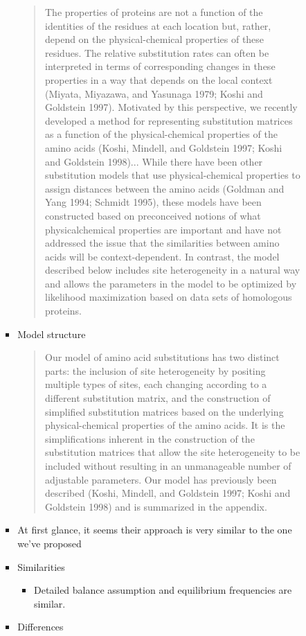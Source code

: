 \begin{itemize}
\begin{itemize}
\begin{itemize}
\begin{itemize}
\begin{quote}
        The properties of proteins are not a function of the identities of the residues at each location but, rather, depend on the physical-chemical properties of these residues. The relative substitution rates can often be interpreted in terms of corresponding changes in these properties in a way that depends on the local context (Miyata, Miyazawa, and Yasunaga 1979; Koshi and Goldstein 1997). Motivated by this perspective, we recently developed a method for representing substitution matrices as a function of the physical-chemical properties of the amino acids (Koshi, Mindell, and Goldstein 1997; Koshi and Goldstein 1998)...  While there have been other substitution models that use physical-chemical properties to assign distances between the amino acids (Goldman and Yang 1994; Schmidt 1995), these models have been constructed based on preconceived notions of what physicalchemical properties are important and have not addressed the issue that the similarities between amino acids will be context-dependent. In contrast, the model described below includes site heterogeneity in a natural way and allows the parameters in the model to be optimized by likelihood maximization based on data sets of homologous proteins.
      \end{quote}
    \item  Model structure
      \begin{quote}
        Our model of amino acid substitutions has two distinct parts: the inclusion of site heterogeneity by positing multiple types of sites, each changing according to a different substitution matrix, and the construction of simplified substitution matrices based on the underlying physical-chemical properties of the amino acids. It is the simplifications inherent in the construction of the substitution matrices that allow the site heterogeneity to be included without resulting in an unmanageable number of adjustable parameters. Our model has previously been described (Koshi, Mindell, and Goldstein 1997; Koshi and Goldstein 1998) and is summarized in the appendix.
      \end{quote}
\item At first glance, it seems their approach is very similar to the one we've proposed
\item Similarities
  \begin{itemize}
  \item Detailed balance assumption and equilibrium frequencies are similar. 
  \end{itemize}
\item Differences

\end{itemize}
\end{itemize}
\end{itemize}
\end{itemize}
